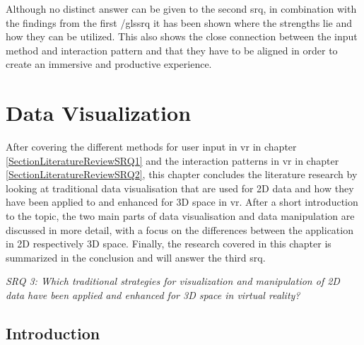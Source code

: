 Although no distinct answer can be given to the second \gls{srq}, in combination with the findings from the first /gls{srq} it has been shown where the strengths lie and how they can be utilized. This also shows the close connection between the input method and interaction pattern and that they have to be aligned in order to create an immersive and productive experience.



\section{Data Visualization}

\label{SectionLiteratureReviewSRQ3}

After covering the different methods for user input in \gls{vr} in chapter \ref{SectionLiteratureReviewSRQ1} and the interaction patterns in \gls{vr} in chapter \ref{SectionLiteratureReviewSRQ2}, this chapter concludes the literature research by looking at traditional data visualisation that are used for 2D data and how they have been applied to and enhanced for 3D space in \gls{vr}. After a short introduction to the topic, the two main parts of data visualisation and data manipulation are discussed in more detail, with a focus on the differences between the application in 2D respectively 3D space. Finally, the research covered in this chapter is summarized in the conclusion and will answer the third \gls{srq}.
\begin{framed}
	\textit{SRQ 3: Which traditional strategies for visualization and manipulation of 2D data have been applied and enhanced for 3D space in virtual reality?}
\end{framed}



\subsection{Introduction}

